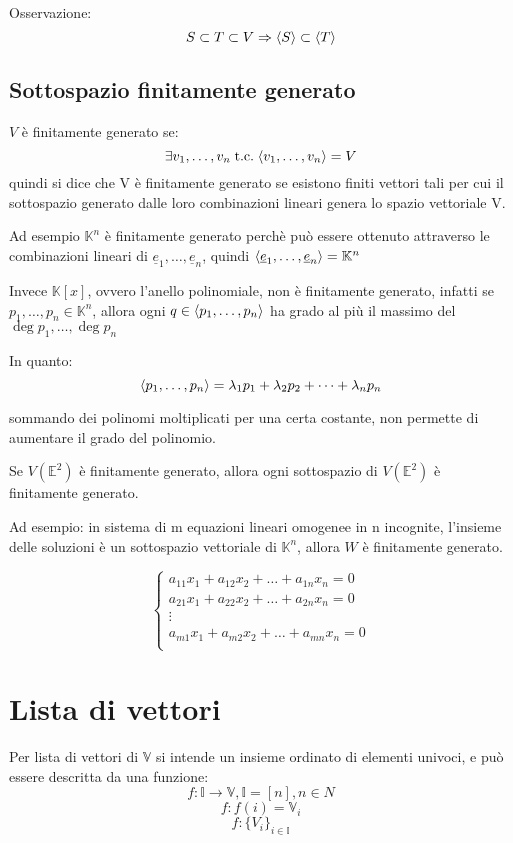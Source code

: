\documentclass[a4paper,12pt]{article}
\begin{document}
	Osservazione:
	\[S \subset T \subset V \Rightarrow \langle S \rangle \subset \langle T \rangle\]
	
	\subsection{Sottospazio finitamente generato}
	$V$ è finitamente generato se:
	\[\exists v_1, \dots, v_n \;\text{t.c.}\; \langle v_1, \dots, v_n \rangle = V\]
	quindi si dice che V è finitamente generato se esistono finiti vettori tali per cui il sottospazio generato dalle loro combinazioni lineari genera lo spazio vettoriale V.
	
	Ad esempio $\mathbb{K}^n$ è finitamente generato perchè può essere ottenuto attraverso le combinazioni lineari di $\underline{e}_1, \dots,\underline{e}_n$, quindi $\langle \underline{e}_1, \dots,\underline{e}_n \rangle = \mathbb{K}^n$
	
	Invece $\mathbb{K}[x]$, ovvero l'anello polinomiale, non è finitamente generato, infatti se $p_1, \dots, p_n \in \mathbb{K}^n$, allora ogni $q \in \langle p_1, \dots, p_n \rangle$ ha grado al più il massimo del $\deg p_1, \dots, \deg p_n$
	
	In quanto:
	\[\langle p_1, \dots, p_n \rangle = \lambda_1 p_1 + \lambda_2 p_2 +\dots + \lambda_n p_n\]
	
	sommando dei polinomi moltiplicati per una certa costante, non permette di aumentare il grado del polinomio.
	
	Se $V(\mathbb{E}^2)$ è finitamente generato, allora ogni sottospazio di $V(\mathbb{E}^2)$ è finitamente generato.
	
	Ad esempio: in sistema di m equazioni lineari omogenee in n incognite, l'insieme delle soluzioni è un sottospazio vettoriale di $\mathbb{K}^n$, allora $W$ è finitamente generato.
	
	\[
	\left\{
	\begin{array}{l}
		a_{11}x_1 + a_{12}x_2 + \dots + a_{1n}x_n = 0 \\
		a_{21}x_1 + a_{22}x_2 + \dots + a_{2n}x_n = 0 \\
		\vdots \\
		a_{m1}x_1 + a_{m2}x_2 + \dots + a_{mn}x_n = 0 \\
	\end{array}
	\right.
	\]
	
	\section{Lista di vettori}
	Per lista di vettori di $\mathbb{V}$ si intende un insieme ordinato di elementi univoci, e può essere descritta da una funzione:
	\[f : \mathbb{I} \longrightarrow \mathbb{V}, \mathbb{I} = [n], n \in N\]
	\[f : f(i) = \mathbb{V}_i\]
	\[f : \{V_i\}_{i \in \mathbb{I}}\]
	
\end{document}
